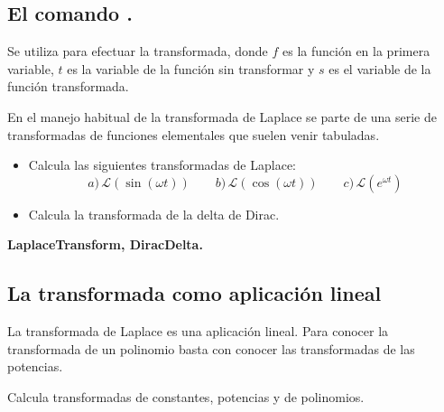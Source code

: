 \documentclass[a4paper,10pt, draft]{article}
\newcommand{\com}[1]{\textbf{\color{blue}{#1}}}
\newenvironment{ejer}{\begin{tcolorbox}[center title, title=Ejercicios,
fonttitle=\sffamily\bfseries,colback=blue!5,colframe=orange]}{\end{tcolorbox}}
\newenvironment{funciones}{\begin{tcolorbox}[center title, title=Nuevas funciones, fonttitle=\sffamily\bfseries, colback=green!5!white,colframe=red!75!black]}{\end{tcolorbox}\bigskip}
\begin{document}
\newpage

\subsection{El comando \com{LaplaceTransform}.}

Se utiliza \com{LaplaceTransform[f,t,s]} para efectuar la transformada, donde $f$ es la función en la primera variable, $t$ es la variable de la función sin transformar y $s$ es el variable de la función transformada.

En el manejo habitual de la transformada de Laplace se parte de una serie de transformadas de funciones elementales que suelen venir tabuladas. 


\begin{ejer}



\begin{itemize}

\item Calcula las siguientes transformadas de Laplace:
\[
a)\,\mathscr{L}(\sin(\omega t)) \qquad  b)\,\mathscr{L}(\cos(\omega t)) \qquad c)\,\mathscr{L}(e^{\omega t})
\]

\item Calcula la transformada de la delta de Dirac.

\end{itemize}

\end{ejer}  

\begin{funciones}

\textbf{LaplaceTransform, DiracDelta.}


\end{funciones}


\newpage


\subsection{La transformada como aplicación lineal}


La transformada de Laplace es una aplicación lineal. Para conocer la transformada de un polinomio basta con conocer las transformadas de las potencias.

\begin{ejer}

 Calcula transformadas  de constantes, potencias y de polinomios.

\end{ejer} 
\end{document}
